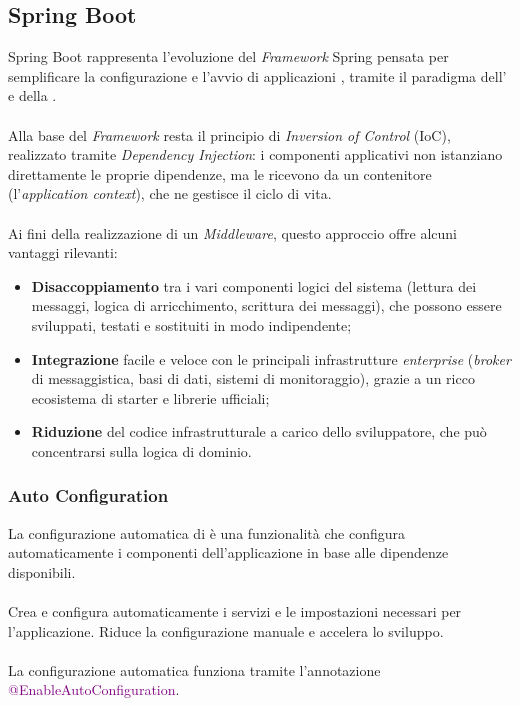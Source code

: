 \subsection{Spring Boot}
\label{Spring Boot}
Spring Boot rappresenta l'evoluzione del \textit{\gls{Framework}} Spring pensata per semplificare la configurazione e l'avvio di applicazioni , tramite il paradigma dell'\textit{} e della \textit{}. \\ \\
Alla base del \textit{\gls{Framework}} resta il principio di \textit{\gls{Inversion of Control}} (\acrshort{IoC}), realizzato tramite \textit{\gls{Dependency Injection}}: i componenti applicativi non istanziano direttamente le proprie dipendenze, ma le ricevono da un contenitore (l'\textit{application context}), che ne gestisce il ciclo di vita. \\ \\
\newpage
\noindent
Ai fini della realizzazione di un \textit{Middleware}, questo approccio offre alcuni vantaggi rilevanti:
\begin{itemize}
    \item \textbf{Disaccoppiamento} tra i vari componenti logici del sistema (lettura dei messaggi, logica di arricchimento, scrittura dei messaggi), che possono essere sviluppati, testati e sostituiti in modo indipendente;
    \item \textbf{Integrazione} facile e veloce con le principali infrastrutture \textit{enterprise} (\textit{broker} di messaggistica, basi di dati, sistemi di monitoraggio), grazie a un ricco ecosistema di starter e librerie ufficiali;
    \item \textbf{Riduzione} del codice infrastrutturale a carico dello sviluppatore, che può concentrarsi sulla logica di dominio.
\end{itemize}
\subsubsection{Auto Configuration}
\label{Auto Configuration}
La configurazione automatica di  è una funzionalità che configura automaticamente i componenti dell'applicazione in base alle dipendenze disponibili. \\ \\
Crea e configura automaticamente i servizi e le impostazioni necessari per l'applicazione.
Riduce la configurazione manuale e accelera lo sviluppo. \\ \\
La configurazione automatica funziona tramite l'annotazione \textcolor{purple}{@EnableAutoConfiguration}.
